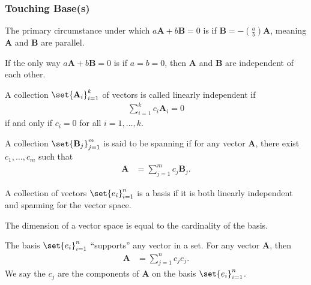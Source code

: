 \documentclass[10pt]{mypackage}
\begin{document}
\subsubsection{Touching Base(s)}%
The primary circumstance under which $a\mathbf{A} + b\mathbf{B} = 0$ is if $\mathbf{B} = -\left(\frac{a}{b}\right)\mathbf{A}$, meaning $\mathbf{A}$ and $\mathbf{B}$ are parallel.\newline

If the only way $a\mathbf{A} + b\mathbf{B} = 0$ is if $a = b = 0$, then $\mathbf{A}$ and $\mathbf{B}$ are independent of each other.
\begin{definition}
  A collection $\set{\mathbf{A}_{i}}_{i=1}^{k}$ of vectors is called linearly independent if
  \begin{align*}
    \sum_{i=1}^{k}c_i\mathbf{A}_i = 0
  \end{align*}
  if and only if $c_i = 0$ for all $i = 1,\dots,k$.
\end{definition}
\begin{definition}
  A collection $\set{\mathbf{B}_j}_{j=1}^{m}$ is said to be spanning if for any vector $\mathbf{A}$, there exist $c_1,\dots,c_m$ such that
  \begin{align*}
    \mathbf{A} &= \sum_{j=1}^{m}c_j\mathbf{B}_j.
  \end{align*}
\end{definition}
\begin{definition}[Basis]
  A collection of vectors $\set{e_i}_{i=1}^{n}$ is a basis if it is both linearly independent and spanning for the vector space.\newline

  The dimension of a vector space is equal to the cardinality of the basis.
\end{definition}
The basis $\set{e_i}_{i=1}^{n}$ ``supports'' any vector in a set. For any vector $\mathbf{A}$, then
\begin{align*}
  \mathbf{A} &= \sum_{j=1}^{n}c_je_j.
\end{align*}
We say the $c_j$ are the components of $\mathbf{A}$ on the basis $\set{e_i}_{i=1}^{n}$.
\end{document}
